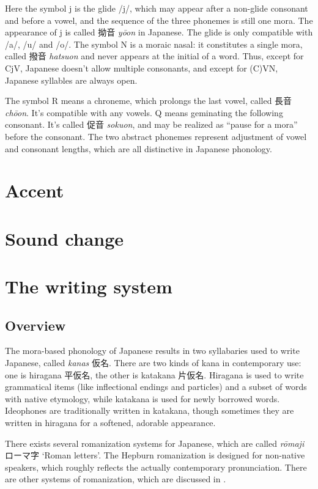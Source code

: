 \documentclass[UTF8, a4paper, oneside, scheme=plain]{ctexrep}
\newcommand*{\term}[1]{\emph{#1}}
\newcommand{\corpus}[1]{\emph{#1}}
\newcommand{\translate}[1]{`#1'}
\begin{document}
Here the symbol j is the glide /j/,
which may appear after a non-glide consonant and before a vowel,
and the sequence of the three phonemes is still one mora.
The appearance of j is called 拗音 \corpus{yōon} in Japanese.
The glide is only compatible with /a/, /u/ and /o/.
The symbol N is a moraic nasal:
it constitutes a single mora, called 撥音 \corpus{hatsuon} 
and never appears at the initial of a word.
Thus, except for CjV, Japanese doesn't allow multiple consonants,
and except for (C)VN, Japanese syllables are always open.

The symbol R means a chroneme,
which prolongs the last vowel,
called 長音 \corpus{chōon}.
It's compatible with any vowels.
Q means geminating the following consonant.
It's called 促音 \corpus{sokuon},
and may be realized as ``pause for a mora'' before the consonant. 
The two abstract phonemes represent adjustment of vowel and consonant lengths,
which are all distinctive in Japanese phonology.

\section{Accent}

\section{Sound change}

\section{The writing system}

\subsection{Overview}

The mora-based phonology of Japanese results in two syllabaries used to write Japanese,
called \term{kanas} 仮名.
There are two kinds of kana in contemporary use:
one is hiragana 平仮名, the other is katakana 片仮名.
Hiragana is used to write grammatical items (like inflectional endings and particles)
and a subset of words with native etymology,
while katakana is used for newly borrowed words.
Ideophones are traditionally written in katakana,
though sometimes they are written in hiragana for a softened, adorable appearance.

There exists several romanization systems for Japanese,
which are called \corpus{rōmaji} ローマ字 \translate{Roman letters}.
The Hepburn romanization is designed for non-native speakers,
which roughly reflects the actually contemporary pronunciation.
There are other systems of romanization, which are discussed in .
\end{document}
